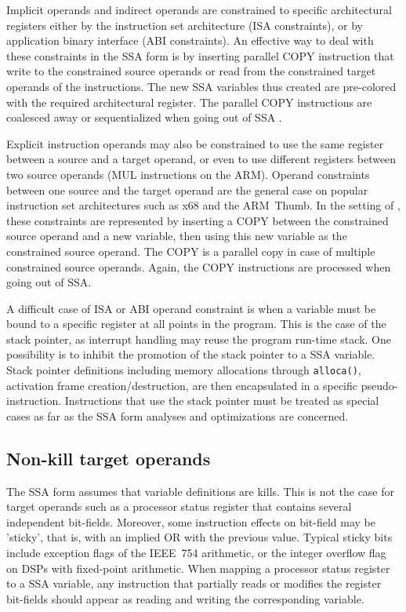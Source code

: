 Implicit operands and indirect operands are constrained to specific
architectural registers either by the instruction set architecture (ISA
constraints), or by application binary interface (ABI constraints). An effective
way to deal with these constraints in the SSA form is by inserting parallel COPY
instruction that write to the constrained source operands or read from the
constrained target operands of the instructions. The new SSA variables thus
created are pre-colored with the required architectural register. The parallel
COPY instructions are coalesced away or sequentialized when going out of SSA
\cite{Boissinot:2009:CGO}.

Explicit instruction operands may also be constrained to use the same register
between a source and a target operand, or even to use different registers
between two source operands (MUL instructions on the ARM). Operand constraints
between one source and the target operand are the general case on popular
instruction set architectures such as x68 and the ARM~Thumb. In the setting of
\cite{Boissinot:2009:CGO}, these constraints are represented by inserting a COPY
between the constrained source operand and a new variable, then using this new
variable as the constrained source operand. The COPY is a parallel copy in case
of multiple constrained source operands. Again, the COPY instructions are
processed when going out of SSA.

A difficult case of ISA or ABI operand constraint is when a variable must be
bound to a specific register at all points in the program. This is the case of
the stack pointer, as interrupt handling may reuse the program run-time stack.
One possibility is to inhibit the promotion of the stack pointer to a SSA
variable. Stack pointer definitions including memory allocations through
\verb|alloca()|, activation frame creation/destruction, are then encapsulated in
a specific pseudo-instruction. Instructions that use the stack pointer must be
treated as special cases as far as the SSA form analyses and optimizations are
concerned.

\subsection{Non-kill target operands} \label{sec:non-kill-target}

The SSA form assumes that variable definitions are kills. This is not the case
for target operands such as a processor status register that contains several
independent bit-fields. Moreover, some instruction effects on bit-field may be
'sticky', that is, with an implied OR with the previous value. Typical sticky
bits include exception flags of the IEEE~754 arithmetic, or the integer overflow
flag on DSPs with fixed-point arithmetic. When mapping a processor status
register to a SSA variable, any instruction that partially reads or modifies the
register bit-fields should appear as reading and writing the corresponding
variable.


